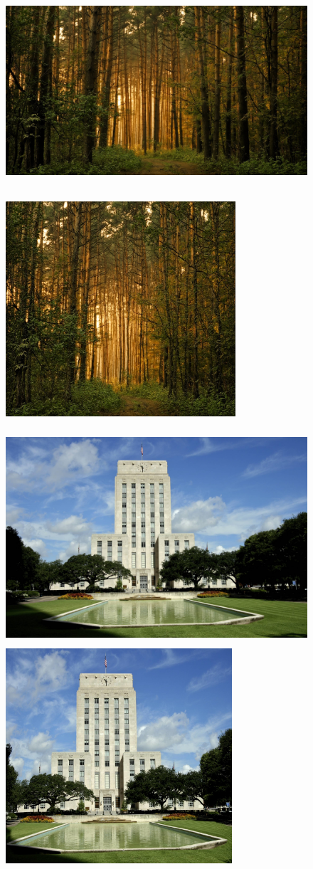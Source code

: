 \begin{figure}[H]
\includegraphics[height=8cm]{src/forest.jpg}\\
\includegraphics[height=8cm]{result/forest0.6.png}
\centering
\end{figure}

\begin{figure}[H]
\includegraphics[height=8cm]{src/city.jpg}\\
\includegraphics[height=8cm]{result/city.png}
\centering
\end{figure}
